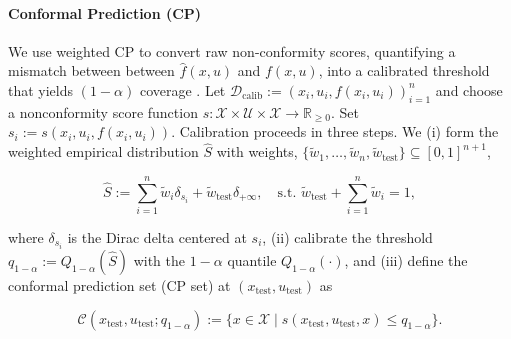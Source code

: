 \documentclass{l4dc2026}
\newcommand{\calib}{\mathcal{D}_{\mathrm{calib}}}
\begin{document}
\paragraph{Conformal Prediction (CP)}
We use weighted CP to convert raw non-conformity scores, quantifying a mismatch between between $\hat f(x,u)$ and $f(x,u)$, into a calibrated threshold that yields $(1-\alpha)$ coverage \citep{vovk2005algorithmic}. Let $\calib:={(x_i,u_i,f(x_i,u_i))}_{i=1}^n$ and choose a nonconformity score function  $s:\mathcal{X}\times\mathcal{U}\times\mathcal{X}\to\mathbb{R}_{\ge0}$. Set $s_i:=s(x_i,u_i,f(x_i,u_i))$. Calibration proceeds in three steps. We
(i) form the weighted empirical distribution $\hat{S}$ with weights, $\{\tilde{w}_{1}, \ldots, \tilde{w}_{n}, \tilde w_\textrm{test}\} \subseteq [0,1]^{n+1}$,

\vspace{-8pt}
\begin{equation}\label{eq:empirical_distribution}\textstyle
\hat{S}:=\sum_{i=1}^n \tilde w_i\delta_{s_i}+\tilde w_{\textrm{test}}\delta_{+\infty},\quad \textrm{s.t. }
\tilde w_{\textrm{test}}+\sum_{i=1}^n \tilde w_i=1,
\end{equation}
\vspace{-13pt}

\noindent where $\delta_{s_i}$ is the Dirac delta centered at $s_i$, (ii) calibrate the threshold $q_{1-\alpha}:=Q_{1-\alpha}(\hat{S})$ with the $1-\alpha$ quantile $Q_{1-\alpha}(\cdot)$, and (iii) define the conformal prediction set (CP set) at $(x_{\textrm{test}},u_{\textrm{test}})$ as

\vspace{-10pt}
\begin{equation}\label{eq:prediction_set}
    \mathcal{C}(x_\textrm{test}, u_\textrm{test}; q_{1-\alpha}):= \{x \in \mathcal{X} \mid s(x_\textrm{test}, u_\textrm{test}, x) \leq q_{1-\alpha}\}.
\end{equation}
\vspace{-15pt}
\end{document}
